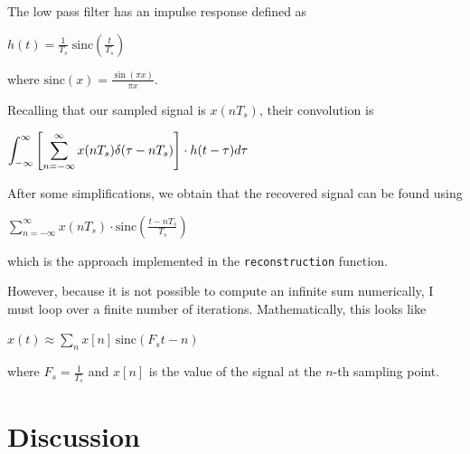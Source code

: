 \documentclass{article}
\begin{document}
The low pass filter has an impulse response defined as
\begin{center}
    \begin{math}
        h(t) = \displaystyle \frac{1}{T_s} \; \text{sinc} \left( \frac{t}{T_s} \right)
    \end{math}
\end{center}
where $\text{sinc}(x) = \frac{\sin(\pi x)}{\pi x}$.

Recalling that our sampled signal is $x(nT_s)$, their convolution is
\begin{center}
    \begin{math}
        \displaystyle \int_{-\infty}^{\infty} \displaystyle \left [ \sum_{n=-\infty}^{\infty} x(nT_s) \delta (\tau - nT_s) \displaystyle \right ] \cdot h(t - \tau) d\tau
    \end{math}
\end{center}

After some simplifications, we obtain that the recovered signal can be found using
\begin{center}
    \begin{math}
        \displaystyle \sum_{n = -\infty}^{\infty} x(nT_s) \cdot \text{sinc} \left( \frac{t-nT_s}{T_s} \right)
    \end{math}
\end{center}
which is the approach implemented in the \verb|reconstruction| function.

However, because it is not possible to compute an infinite sum numerically, I must loop over a finite number of iterations. Mathematically, this looks like
\begin{center}
    \begin{math}
        x(t) \approx \displaystyle\sum_{n}^{} x[n]\, \text{sinc}\left( F_st - n \right)
    \end{math}  
\end{center}
where $F_s = \frac{1}{T_s}$ and $x[n]$ is the value of the signal at the $n$-th sampling point.

\newpage 
\section{Discussion}

\end{document}
